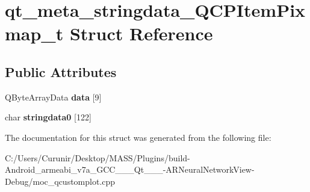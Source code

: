 \hypertarget{structqt__meta__stringdata___q_c_p_item_pixmap__t}{}\section{qt\+\_\+meta\+\_\+stringdata\+\_\+\+Q\+C\+P\+Item\+Pixmap\+\_\+t Struct Reference}
\label{structqt__meta__stringdata___q_c_p_item_pixmap__t}
\subsection*{Public Attributes}
\begin{DoxyCompactItemize}
\item 
\mbox{\label{structqt__meta__stringdata___q_c_p_item_pixmap__t_a92416f877b5d0b96d3c2299f7fc964d5}} 
Q\+Byte\+Array\+Data {\bfseries data} \mbox{[}9\mbox{]}
\item 
\mbox{\label{structqt__meta__stringdata___q_c_p_item_pixmap__t_aa3171254b33c333a4e785aeca76d1f3f}} 
char {\bfseries stringdata0} \mbox{[}122\mbox{]}
\end{DoxyCompactItemize}


The documentation for this struct was generated from the following file\+:\begin{DoxyCompactItemize}
\item 
C\+:/\+Users/\+Curunir/\+Desktop/\+M\+A\+S\+S/\+Plugins/build-\/\+Android\+\_\+armeabi\+\_\+v7a\+\_\+\+G\+C\+C\+\_\+\_\+\_\+\+Qt\+\_\+\_\+\_-\/\+A\+R\+Neural\+Network\+View-\/\+Debug/moc\+\_\+qcustomplot.\+cpp\end{DoxyCompactItemize}
